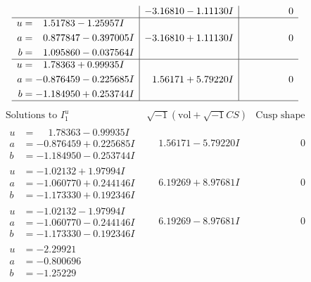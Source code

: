 \documentclass[1p]{elsarticle_modified}
\theoremstyle{definition}
\newcommand{\I}{\sqrt{-1}}
\begin{document}
$$\begin{array}{c|c|c}
 & -3.16810 - 1.11130 I & \phantom{-0.000000 } 0 \\ \hline\begin{aligned}
u &= \phantom{-}1.51783 - 1.25957 I \\
a &= \phantom{-}0.877847 - 0.397005 I \\
b &= \phantom{-}1.095860 - 0.037564 I\end{aligned}
 & -3.16810 + 1.11130 I & \phantom{-0.000000 } 0 \\ \hline\begin{aligned}
u &= \phantom{-}1.78363 + 0.99935 I \\
a &= -0.876459 - 0.225685 I \\
b &= -1.184950 + 0.253744 I\end{aligned}
 & \phantom{-}1.56171 + 5.79220 I & \phantom{-0.000000 } 0\\
 \hline 
 \end{array}$$\newpage$$\begin{array}{c|c|c}  
\text{Solutions to }I^u_{1}& \I (\text{vol} + \sqrt{-1}CS) & \text{Cusp shape}\\
 \hline 
\begin{aligned}
u &= \phantom{-}1.78363 - 0.99935 I \\
a &= -0.876459 + 0.225685 I \\
b &= -1.184950 - 0.253744 I\end{aligned}
 & \phantom{-}1.56171 - 5.79220 I & \phantom{-0.000000 } 0 \\ \hline\begin{aligned}
u &= -1.02132 + 1.97994 I \\
a &= -1.060770 + 0.244146 I \\
b &= -1.173330 + 0.192346 I\end{aligned}
 & \phantom{-}6.19269 + 8.97681 I & \phantom{-0.000000 } 0 \\ \hline\begin{aligned}
u &= -1.02132 - 1.97994 I \\
a &= -1.060770 - 0.244146 I \\
b &= -1.173330 - 0.192346 I\end{aligned}
 & \phantom{-}6.19269 - 8.97681 I & \phantom{-0.000000 } 0 \\ \hline\begin{aligned}
u &= -2.29921\phantom{ +0.000000I} \\
a &= -0.800696\phantom{ +0.000000I} \\
b &= -1.25229\phantom{ +0.000000I}\end{aligned}

\end{array}$$
\end{document}
